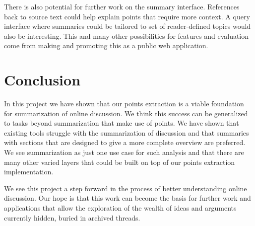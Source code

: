     There is also potential for further work on the summary interface. References back to source text could help explain points that require more context. A query interface where summaries could be tailored to set of reader-defined topics would also be interesting. This and many other possibilities for features and evaluation come from making and promoting this as a public web application.

  \section{Conclusion}
    In this project we have shown that our points extraction is a viable foundation for summarization of online discussion. We think this success can be generalized to tasks beyond summarization that make use of points. We have shown that existing tools struggle with the summarization of discussion and that summaries with sections that are designed to give a more complete overview are preferred. We see summarization as just one use case for such analysis and that there are many other varied layers that could be built on top of our points extraction implementation.

    We see this project a step forward in the process of better understanding online discussion. Our hope is that this work can become the basis for further work and applications that allow the exploration of the wealth of ideas and arguments currently hidden, buried in archived threads.
